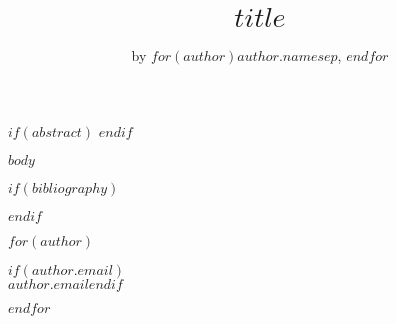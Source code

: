 \title{$title$}
\author{by $for(author)$$author.name$$sep$, $endfor$}

\maketitle

$if(abstract)$
$endif$

$body$

$if(bibliography)$

$endif$

$for(author)$
\address{%
$author.name$\\
$for(author.affiliation/pairs)$
  $if(it.value)$
    $for(it.value.name)$$it.value.name$\\$endfor$%
    $for(it.value.address)$$it.value.address$$sep$ \\$endfor$%
    $for(it.value.email)$\\$it.value.email$\\\\$endfor$%
  $else$
   $author.affiliation$\\
  $endif$
$endfor$
$for(author.address)$$author.address$$sep$ \\$endfor$%
}
$if(author.email)$\\$author.email$$endif$

$endfor$
